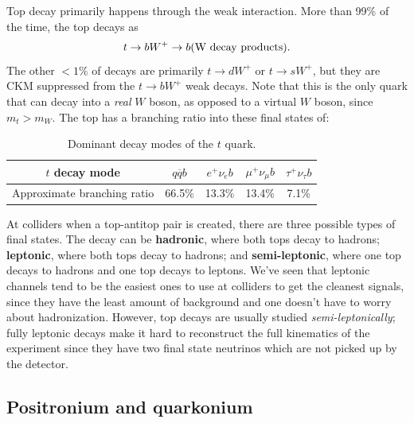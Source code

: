 \documentclass[11pt, oneside]{article}   	%
\theoremstyle{definition}
\numberwithin{equation}{subsection}		%
\begin{document}
Top decay primarily happens through the weak interaction. More than 99\% of the time, the top decays as
\begin{equation}
	t\rightarrow b W^+\rightarrow b (\textnormal{W decay products}).
\end{equation}
The other $< 1\%$ of decays are primarily $t\rightarrow d W^+$ or $t\rightarrow s W^+$, but they are CKM suppressed from the $t\rightarrow 
b W^+$ weak decays. Note that this is the only quark that can decay into a \textit{real} $W$ boson, as opposed to a virtual $W$ boson, since 
$m_t > m_W$. The top has a branching ratio into these final states of:
\begin{table}[H]
	\centering
	\begin{tabular}{ | c | c | c | c | c | }
		\hline
		$t$ decay mode & $q\overline q b$ & $e^+\nu_e b$ & $\mu^+\nu_\mu b$ & $\tau^+ \nu_\tau b$ \\
		\hline
		Approximate branching ratio & 66.5\% & 13.3\% & 13.4\% & 7.1\% \\
		\hline
	\end{tabular}
	\caption{Dominant decay modes of the $t$ quark.}
	\label{table:t_decay}
\end{table}
At colliders when a top-antitop pair is created, there are three possible types of final states. The decay can be \textbf{hadronic}, where 
both tops decay to hadrons; \textbf{leptonic}, where both tops decay to hadrons; and \textbf{semi-leptonic}, where one top decays to 
hadrons and one top decays to leptons. We've seen that leptonic channels tend to be the easiest ones to use at colliders to get the 
cleanest signals, since they have the least amount of background and one doesn't have to worry about hadronization. However, 
top decays are usually studied \textit{semi-leptonically}; fully leptonic decays make it hard to reconstruct the full kinematics of the experiment 
since they have two final state neutrinos which are not picked up by the detector. 

\subsection{Positronium and quarkonium}
\end{document}
